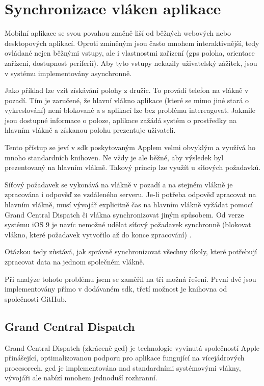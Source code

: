 \section{Synchronizace vláken aplikace} \label{analyza-synchronizace-vlaken}

Mobilní aplikace se svou povahou značně liší od běžných webových nebo desktopových aplikací.
Oproti zmíněným jsou často mnohem interaktivnější, tedy ovládané nejen běžnými vstupy, ale i vlastnostmi zařízení (\acrshort{gps} poloha, orientace zařízení, dostupnost periferií).
Aby tyto vstupy nekazily uživatelský zážitek, jsou v systému implementovány asynchronně.

Jako příklad lze vzít získávání polohy z družic.
To provádí telefon na vlákně v pozadí.
Tím je zaručené, že hlavní vlákno aplikace (které se mimo jiné stará o vykreslování) není blokované a s aplikací lze bez problému intereagovat.
Jakmile jsou dostupné informace o poloze, aplikace zažádá systém o prostředky na hlavním vlákně a získanou polohu prezentuje uživateli.

Tento přístup se jeví v \acrfull{sdk} poskytovaným Applem velmi obvyklým a využívá ho mnoho standardních knihoven.
Ne vždy je ale běžné, aby výsledek byl prezentovaný na hlavním vlákně.
Takový princip lze využít u síťových požadavků.

Síťový požadavek se vykonává na vlákně v pozadí a na stejném vlákně je zpracována i odpověď ze vzdáleného serveru.
Je-li potřeba odpověď zpracovat na hlavním vlákně, musí vývojář explicitně čas na hlavním vlákně vyžádat pomocí Grand Central Dispatch či vlákna synchronizovat jiným spůsobem.
Od verze systému iOS 9 je navíc nemožné udělat síťový požadavek synchronně (blokovat vlákno, které požadavek vytvořilo až do konce zpracování) \cite{apple-whats-new-in-ios}.

Otázkou tedy zůstává, jak správně synchronizovat všechny úkoly, které potřebují zpracovat data na jednom společném vlákně.

Při analýze tohoto problému jsem se zaměřil na tři možná řešení.
První dvě jsou implementovány přímo v dodávaném \acrshort{sdk}, třetí možnost je knihovna od společnosti GitHub.

\subsection{Grand Central Dispatch}

Grand Central Dispatch (zkráceně \acrshort{gcd}) je technologie vyvinutá společností Apple přinášející, optimalizovanou podporu pro aplikace fungující na vícejádrových procesorech.
\acrshort{gcd} je implementována nad standardními systémovými vlákny, vývojáři ale nabízí mnohem jednoduší rozhranní.

